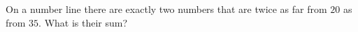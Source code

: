 On a number line there are exactly two numbers that are twice as far from $20$ as from $35$. What is their sum?
